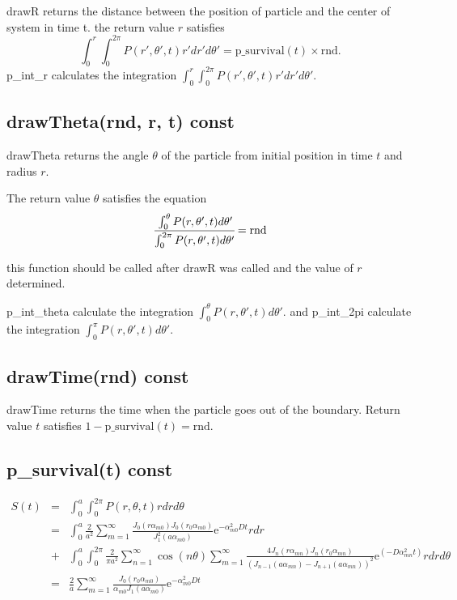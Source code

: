\documentclass{article}
\begin{document}
drawR returns the distance between
the position of particle and the center of system in time t.
the return value $r$ satisfies
\begin{equation}
    \int^r_0 \int^{2\pi}_0 P(r', \theta', t) r'dr'd\theta' =
    \mathrm{p\_survival}(t) \times \mathrm{rnd}.
\end{equation}
p\_int\_r calculates the integration
$\int^r_0 \int^{2\pi}_0 P(r', \theta', t) r'dr'd\theta'$.

\subsection{drawTheta(rnd, r, t) const}

drawTheta returns the angle $\theta$ of the particle from initial position in time $t$ and radius $r$.

The return value $\theta$ satisfies the equation
\begin{equation}
    \cfrac{\int^\theta_0 P(r, \theta', t) d\theta'}
          {\int^{2\pi}_0 P(r, \theta', t) d\theta'} = \mathrm{rnd}
\end{equation}

this function should be called after drawR was called and
the value of $r$ determined.

p\_int\_theta calculate the integration
$\int^\theta_0 P(r, \theta', t) d\theta'$.
and p\_int\_2pi calculate the integration
$\int^\pi_0 P(r, \theta', t) d\theta'$.

\subsection{drawTime(rnd) const}

drawTime returns the time when the particle goes out of the boundary.
Return value $t$ satisfies $1 - \mathrm{p\_survival}(t) = \mathrm{rnd}$.

\subsection{p\_survival(t) const}

\begin{eqnarray}
    S(t) &=& \int^a_0 \int^{2\pi}_0 P(r, \theta, t) rdrd\theta \nonumber \\
         &=& \int^a_0 \frac{2}{a^2} \sum^{\infty}_{m=1}
             \frac{J_0(r\alpha_{m0}) J_0(r_0\alpha_{m0})}{J^2_1(a\alpha_{m0})}
             \mathrm{e}^{-\alpha^2_{m0}Dt} rdr \nonumber \\
         &+& \int^a_0 \int^{2\pi}_0 \frac{2}{\pi a^2}
             \sum^{\infty}_{n=1}\cos(n\theta)
             \sum^{\infty}_{m=1}
             \frac{4J_n(r\alpha_{mn})J_n(r_0\alpha_{mn})}
                  {(J_{n-1}(a\alpha_{mn})-J_{n+1}(a\alpha_{mn}))^2}
             \mathrm{e}^{(-D\alpha^2_{mn} t)} rdrd\theta \nonumber \\
         &=& \frac{2}{a} \sum^{\infty}_{m=1}
             \frac{J_0(r_0\alpha_{m0})}{\alpha_{m0} J_1(a\alpha_{m0})}
             \mathrm{e}^{-\alpha^2_{m0}Dt} \nonumber
\end{eqnarray}
\end{document}
